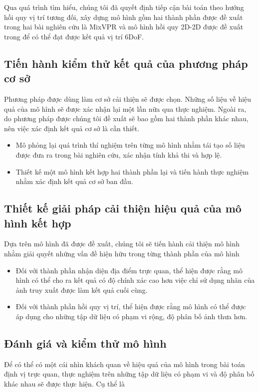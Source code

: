 Qua quá trình tìm hiểu, chúng tôi đã quyết định tiếp cận bài toán theo hướng hồi quy vị trí tương đối, xây dựng mô hình gồm hai thành phần được đề xuất trong hai bài nghiên cứu là MixVPR \cite{alibey2023mixvpr} và mô hình hồi quy 2D-2D được đề xuất trong \cite{arnold2022mapfree} để có thể đạt được kết quả vị trí 6DoF.

\subsection{Tiến hành kiểm thử kết quả của phương pháp cơ sở}
Phương pháp được dùng làm cơ sở cải thiện sẽ được chọn. Những số liệu về hiệu quả của mô hình sẽ được xác nhận lại một lần nữa qua thực nghiệm. Ngoài ra, do phương pháp được chúng tôi đề xuất sẽ bao gồm hai thành phần khác nhau, nên việc xác định kết quả cơ sở là cần thiết.
\begin{itemize}
    \item Mô phỏng lại quá trình thí nghiệm trên từng mô hình nhằm tái tạo số liệu được đưa ra trong bài nghiên cứu, xác nhận tính khả thi và hợp lệ.
    \item Thiết kế một mô hình kết hợp hai thành phần lại và tiến hành thực nghiệm nhằm xác định kết quả cơ sở ban đầu.
\end{itemize}

\subsection{Thiết kế giải pháp cải thiện hiệu quả của mô hình kết hợp}
Dựa trên mô hình đã được đề xuất, chúng tôi sẽ tiến hành cải thiện mô hình nhằm giải quyết những vấn đề hiện hữu trong từng thành phần của mô hình
\begin{itemize}
    \item Đối với thành phần nhận diện địa điểm trực quan, thể hiện được rằng mô hình có thể cho ra kết quả có độ chính xác cao hơn việc chỉ sử dụng nhãn của ảnh truy xuất được làm kết quả cuối cùng.
    \item Đối với thành phần hồi quy vị trí, thể hiện được rằng mô hình có thể được áp dụng cho những tập dữ liệu có phạm vi rộng, độ phân bố ảnh thưa hơn.
\end{itemize}

\subsection{Đánh giá và kiểm thử mô hình}
Để có thể có một cái nhìn khách quan về hiệu quả của mô hình trong bài toán định vị trực quan, thực nghiệm trên những tập dữ liệu có phạm vi và độ phân bố khác nhau sẽ được thực hiện. Cụ thể là

